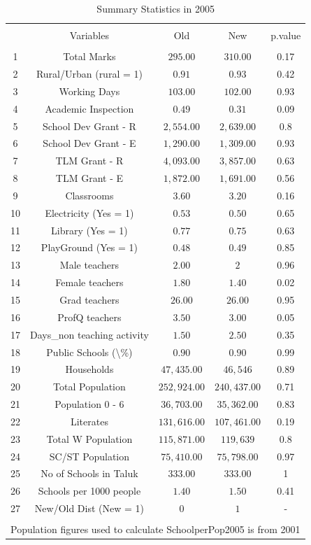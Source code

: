 \documentclass[12pt, a4paper]{article}
\begin{document}
\begin{table}[!htbp] \centering 
  \caption{Summary Statistics in 2005} 
  \label{} 
\begin{tabular}{@{\extracolsep{5pt}} ccccc} 
\\[-1.8ex]\hline 
\hline \\[-1.8ex] 
 & Variables & Old & New & p.value \\ 
\hline \\[-1.8ex] 
1 & Total Marks & $295.00$ & $310.00$ & 0.17 \\ 
2 & Rural/Urban (rural = 1) & $0.91$ & $0.93$ & 0.42 \\ 
3 & Working Days & $103.00$ & $102.00$ & 0.93 \\ 
4 & Academic Inspection & $0.49$ & $0.31$ & 0.09 \\ 
5 & School Dev Grant - R & $2,554.00$ & $2,639.00$ & 0.8 \\ 
6 & School Dev Grant - E & $1,290.00$ & $1,309.00$ & 0.93 \\ 
7 & TLM Grant - R & $4,093.00$ & $3,857.00$ & 0.63 \\ 
8 & TLM Grant - E & $1,872.00$ & $1,691.00$ & 0.56 \\ 
9 & Classrooms & $3.60$ & $3.20$ & 0.16 \\ 
10 & Electricity (Yes = 1) & $0.53$ & $0.50$ & 0.65 \\ 
11 & Library  (Yes = 1) & $0.77$ & $0.75$ & 0.63 \\ 
12 & PlayGround  (Yes = 1) & $0.48$ & $0.49$ & 0.85 \\ 
13 & Male teachers & $2.00$ & $2$ & 0.96 \\ 
14 & Female teachers & $1.80$ & $1.40$ & 0.02 \\ 
15 & Grad teachers & $26.00$ & $26.00$ & 0.95 \\ 
16 & ProfQ teachers & $3.50$ & $3.00$ & 0.05 \\ 
17 & Days\_non teaching activity & $1.50$ & $2.50$ & 0.35 \\ 
18 & Public Schools (\textbackslash \%) & $0.90$ & $0.90$ & 0.99 \\ 
19 & Households & $47,435.00$ & $46,546$ & 0.89 \\ 
20 & Total Population & $252,924.00$ & $240,437.00$ & 0.71 \\ 
21 & Population 0 - 6 & $36,703.00$ & $35,362.00$ & 0.83 \\ 
22 & Literates & $131,616.00$ & $107,461.00$ & 0.19 \\ 
23 & Total W Population & $115,871.00$ & $119,639$ & 0.8 \\ 
24 & SC/ST Population & $75,410.00$ & $75,798.00$ & 0.97 \\ 
25 & No of Schools in Taluk & $333.00$ & $333.00$ & 1 \\ 
26 & Schools per 1000 people & $1.40$ & $1.50$ & 0.41 \\ 
27 & New/Old Dist (New = 1) & $0$ & $1$ & - \\ 
\hline \\[-1.8ex] 
\multicolumn{5}{l}{Population figures used to calculate SchoolperPop2005 is from 2001} \\ 
\end{tabular} 
\end{table} 
\end{document}
